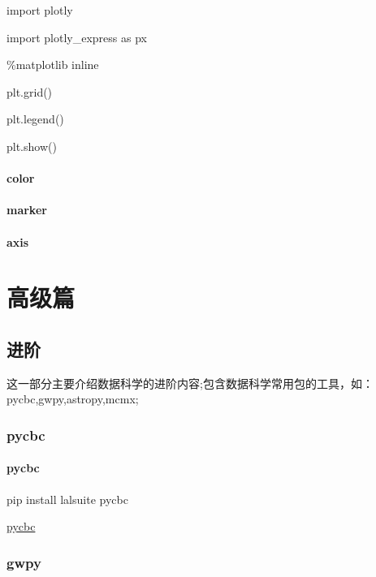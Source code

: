 \documentclass[letterpaper,10pt,english]{sphinxmanual}
\begin{document}
import plotly

import plotly\_express as px

\%matplotlib inline

plt.grid()

plt.legend()

plt.show()


\subsubsection{color}
\label{\detokenize{base/04_matplotlib:color}}

\subsubsection{marker}
\label{\detokenize{base/04_matplotlib:marker}}

\subsubsection{axis}
\label{\detokenize{base/04_matplotlib:axis}}

\chapter{高级篇}
\label{\detokenize{advanced/index::doc}}\label{\detokenize{advanced/index:id1}}

\section{进阶}
\label{\detokenize{advanced/index:id2}}
这一部分主要介绍数据科学的进阶内容;包含数据科学常用包的工具，如：
pycbc,gwpy,astropy,mcmx;


\subsection{pycbc}
\label{\detokenize{advanced/01_pycbc:pycbc}}\label{\detokenize{advanced/01_pycbc::doc}}

\subsubsection{pycbc}
\label{\detokenize{advanced/01_pycbc:id1}}
pip install lalsuite pycbc

\href{https://pycbc.org/}{pycbc}


\subsection{gwpy}
\label{\detokenize{advanced/02_gwpy::doc}}\label{\detokenize{advanced/02_gwpy:id2}}\label{\detokenize{advanced/02_gwpy:gwpy}}
\end{document}
